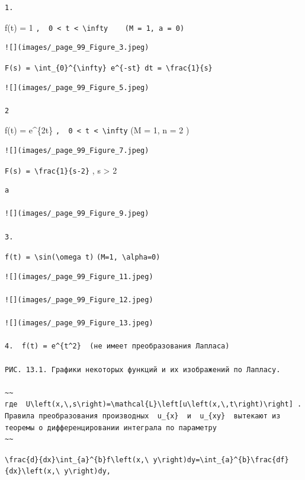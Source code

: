 \documentclass[
  ukrainian,
]{article}
\begin{document}
\begin{verbatim}
1.
\end{verbatim}

f(t) = 1
\texttt{,\ \ 0\ \textless{}\ t\ \textless{}\ \textbackslash{}infty\ \ \ \ (M\ =\ 1,\ a\ =\ 0)}

\begin{verbatim}
![](images/_page_99_Figure_3.jpeg)
\end{verbatim}

\texttt{F(s)\ =\ \textbackslash{}int\_\{0\}\^{}\{\textbackslash{}infty\}\ e\^{}\{-st\}\ dt\ =\ \textbackslash{}frac\{1\}\{s\}}

\begin{verbatim}
![](images/_page_99_Figure_5.jpeg)

2
\end{verbatim}

f(t) = e\^{}\{2t\}
\texttt{,\ \ 0\ \textless{}\ t\ \textless{}\ \textbackslash{}infty} (M =
1, n = 2 )

\begin{verbatim}
![](images/_page_99_Figure_7.jpeg)
\end{verbatim}

\texttt{F(s)\ =\ \textbackslash{}frac\{1\}\{s-2\}} , s \textgreater{} 2

\begin{verbatim}
a

![](images/_page_99_Figure_9.jpeg)

3.
\end{verbatim}

\texttt{f(t)\ =\ \textbackslash{}sin(\textbackslash{}omega\ t)}
\texttt{(M=1,\ \textbackslash{}alpha=0)}

\begin{verbatim}
![](images/_page_99_Figure_11.jpeg)

![](images/_page_99_Figure_12.jpeg)

![](images/_page_99_Figure_13.jpeg)

4.  f(t) = e^{t^2}  (не имеет преобразования Лапласа)

РИС. 13.1. Графики некоторых функций и их изображений по Лапласу.

~~
где  U\left(x,\,s\right)=\mathcal{L}\left[u\left(x,\,t\right)\right] . Правила преобразования производных  u_{x}  и  u_{xy}  вытекают из теоремы о дифференцировании интеграла по параметру
~~
\end{verbatim}

\texttt{\textbackslash{}frac\{d\}\{dx\}\textbackslash{}int\_\{a\}\^{}\{b\}f\textbackslash{}left(x,\textbackslash{}\ y\textbackslash{}right)dy=\textbackslash{}int\_\{a\}\^{}\{b\}\textbackslash{}frac\{df\}\{dx\}\textbackslash{}left(x,\textbackslash{}\ y\textbackslash{}right)dy,}
\end{document}
